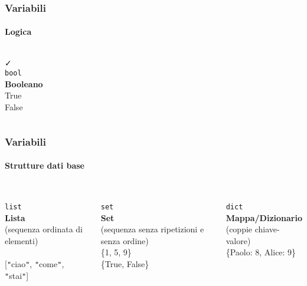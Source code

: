 \begin{contentframe}
    \frametitle{Variabili}
    \framesubtitle{Logica}

    \begin{columns}
        \centering
        {\Huge\faCheck}\\
        \bigskip
        \texttt{bool}\\
        \textbf{Booleano}\\
        \bigskip
        True\\False
    \end{columns}
\end{contentframe}

\begin{contentframe}
    \frametitle{Variabili}
    \framesubtitle{Strutture dati base}

    \begin{columns}
        \centering
        {\Huge\faListOl}\\
        \bigskip
        \texttt{list}\\
        \textbf{Lista}\\
        (sequenza ordinata di elementi)\\
        \bigskip
        [1, 2, 2, 3]\\
        
        [\texttt{"}ciao\texttt{"}, \texttt{"}come\texttt{"}, \texttt{"}stai\texttt{"}]

        \centering
        {\Huge\faBars}\\
        \bigskip
        \texttt{set}\\
        \textbf{Set}\\
        (sequenza senza ripetizioni e senza ordine)\\
        \bigskip
        \{1, 5, 9\}\\
        \{True, False\}

        \centering
        {\Huge\faThList}\\
        \bigskip
        \texttt{dict}\\
        \textbf{Mappa/Dizionario}\\
        (coppie chiave-valore)\\
        \bigskip
        \bigskip
        \{\textquotesingle{}Paolo\textquotesingle{}: 8, \textquotesingle{}Alice\textquotesingle{}: 9\}
        \bigskip
    \end{columns}
\end{contentframe}

